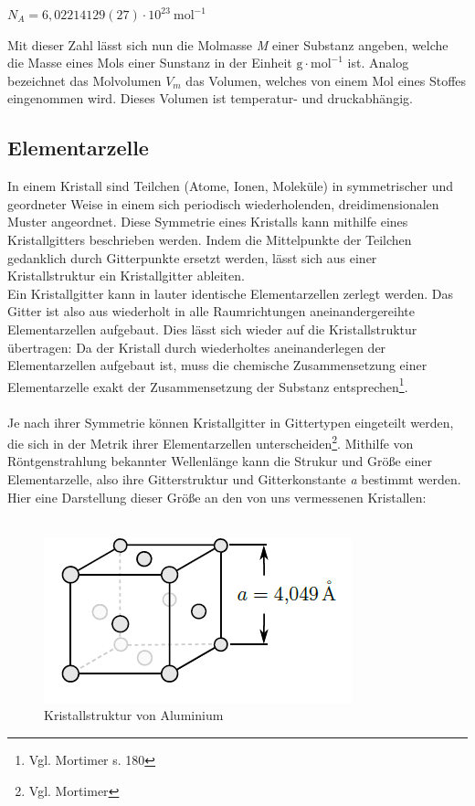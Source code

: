 \documentclass[12pt,a4paper,titlepage,headinclude,bibtotoc]{scrartcl}
\begin{document}
\begin{center}
$N_{A}=6,02214129(27)\cdot 10^{23}\ \mathrm{mol^{-1}}$ 
\end{center}

Mit dieser Zahl lässt sich nun die Molmasse \textit{M} einer Substanz angeben, welche die Masse eines Mols einer Sunstanz in der Einheit $ \mathrm{g \cdot mol^{-1}}$ ist. Analog bezeichnet das Molvolumen $V_{m}$ das Volumen, welches von einem Mol eines Stoffes eingenommen wird. Dieses Volumen ist temperatur- und druckabhängig.

\subsection{Elementarzelle}
In einem Kristall sind Teilchen (Atome, Ionen, Moleküle) in symmetrischer und geordneter Weise in einem sich periodisch wiederholenden, dreidimensionalen Muster angeordnet. Diese Symmetrie eines Kristalls kann mithilfe eines Kristallgitters beschrieben werden. Indem die Mittelpunkte der Teilchen gedanklich durch Gitterpunkte ersetzt werden, lässt sich aus einer Kristallstruktur ein Kristallgitter ableiten.\\
Ein Kristallgitter kann in lauter identische Elementarzellen zerlegt werden. Das Gitter ist also aus wiederholt in alle Raumrichtungen aneinandergereihte Elementarzellen aufgebaut. Dies lässt sich wieder auf die Kristallstruktur übertragen: Da der Kristall durch wiederholtes aneinanderlegen der Elementarzellen aufgebaut ist, muss die chemische Zusammensetzung einer Elementarzelle exakt der Zusammensetzung der Substanz entsprechen\footnote{Vgl. Mortimer s. 180}.\\\\
Je nach ihrer Symmetrie können Kristallgitter in Gittertypen eingeteilt werden, die sich in der Metrik ihrer Elementarzellen unterscheiden\footnote{Vgl. Mortimer}. Mithilfe von Röntgenstrahlung bekannter Wellenlänge kann die Strukur und Größe einer Elementarzelle, also ihre Gitterstruktur und Gitterkonstante \textit{a} bestimmt werden. Hier eine Darstellung dieser Größe an den von uns vermessenen Kristallen:\\\\


\begin{figure} [h]
\begin{center}
\includegraphics[scale=0.7]{Aluminium.png} \end{center}
\caption{Kristallstruktur von Aluminium}
\end{figure}
\end{document}

